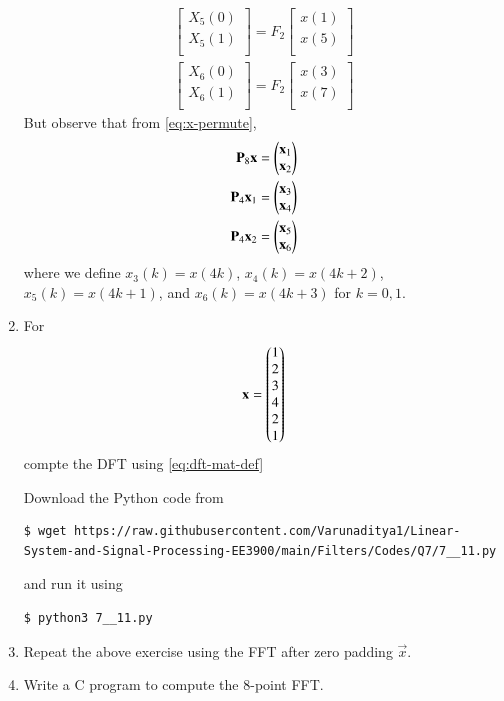 \documentclass[journal,12pt,twocolumn]{IEEEtran}
\renewcommand\thesection{\arabic{section}}
\begin{document}
\begin{enumerate}[label=\thesection.\arabic*.,ref=\thesection.\theenumi]
\begin{align}
\begin{bmatrix}
X_{5}(0) \\ 
X_{5}(1)\\ 
\end{bmatrix}
= F_{2}
\begin{bmatrix}
x(1) \\ 
x(5) \\ 
\end{bmatrix} \\
\begin{bmatrix}
X_{6}(0) \\ 
X_{6}(1)\\ 
\end{bmatrix}
= F_{2}
\begin{bmatrix}
x(3) \\ 
x(7) \\ 
\end{bmatrix}
\end{align}
But observe that from \eqref{eq:x-permute},
\begin{align}
	\mathbf{P}_8\mathbf{x} &= \begin{pmatrix}\mathbf{x}_1\\\mathbf{x}_2\end{pmatrix} \\
	\mathbf{P}_4\mathbf{x}_1 &= \begin{pmatrix}\mathbf{x}_3\\\mathbf{x}_4\end{pmatrix} \\ 
	\mathbf{P}_4\mathbf{x}_2 &= \begin{pmatrix}\mathbf{x}_5\\\mathbf{x}_6\end{pmatrix}
\end{align}
where we define $x_3(k) = x(4k)$, $x_4(k) = x(4k + 2)$, $x_5(k) = x(4k + 1)$, and $x_6(k) = x(4k + 3)$ for $k = 0, 1$.
\item For 
    \begin{align}
	    \mathbf{x} = \begin{pmatrix}1\\2\\3\\4\\2\\1\end{pmatrix}
        \label{eq:equation1}
    \end{align}
    compte the DFT  
		using 
	    \eqref{eq:dft-mat-def}

\solution Download the Python code from 
\begin{lstlisting}
$ wget https://raw.githubusercontent.com/Varunaditya1/Linear-System-and-Signal-Processing-EE3900/main/Filters/Codes/Q7/7__11.py
\end{lstlisting}
and run it using
\begin{lstlisting}
$ python3 7__11.py
\end{lstlisting}
\item Repeat the above exercise using the FFT
    after zero padding $\vec{x}$.
\item Write a C program to compute the 8-point FFT. 


\end{enumerate}
\end{document}
